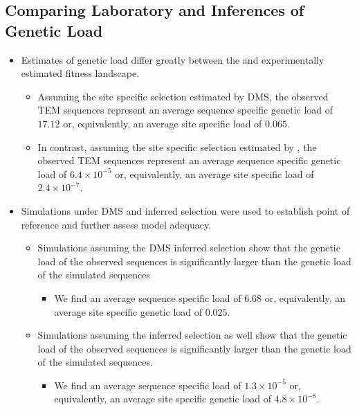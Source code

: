 \documentclass[12pt]{article}
\begin{document}
\subsection*{Comparing Laboratory and \selac Inferences of Genetic Load}
\begin{itemize}
	\item Estimates of genetic load differ greatly between the \selac and experimentally estimated fitness landscape.
	\begin{itemize}
		\item Assuming the site specific selection estimated by DMS, the observed TEM sequences represent an average sequence specific genetic load of $17.12$ or, equivalently, an average site specific load of $0.065$.
		\item In contrast, assuming the site specific selection estimated by \selac, the observed TEM sequences represent an average sequence specific genetic load of $6.4\times10^{-5}$ or, equivalently, an average site specific load of $2.4\times10^{-7}$.
	\end{itemize}
	\item Simulations under DMS and \selac inferred selection were used to establish point of reference and further assess model adequacy.
	\begin{itemize}
		\item Simulations assuming the DMS inferred selection show that the genetic load of the observed sequences is significantly larger than the genetic load of the simulated sequences
		\begin{itemize}
			\item We find an average sequence specific load of $6.68$ or, equivalently, an average site specific genetic load of $0.025$.
		\end{itemize}
		\item Simulations assuming the \selac inferred selection as well show that the genetic load of the observed sequences is significantly larger than the genetic load of the simulated sequences.
		\begin{itemize}
			\item We find an average sequence specific load of $1.3\times10^{-5}$ or, equivalently, an average site specific genetic load of $4.8\times10^{-8}$.
		\end{itemize}
	\end{itemize}
\end{itemize}
\end{document}
